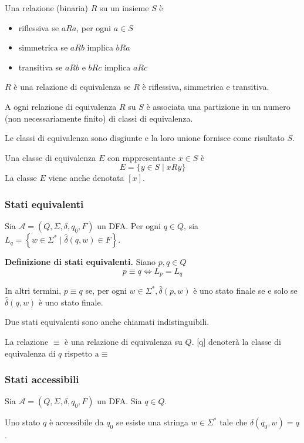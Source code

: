 Una relazione (binaria) $R$ su un insieme $S$ è
\begin{itemize}
    \item riflessiva se $a R a$, per ogni $a \in S$
    \item simmetrica se $a R b$ implica $b R a$
    \item transitiva se $a R b$ e $b R c$ implica $a R c$
\end{itemize}

$R$ è una relazione di equivalenza se $R$ è riflessiva, simmetrica e transitiva.

A ogni relazione di equivalenza $R$ su $S$ è associata una partizione in un numero (non necessariamente finito) di classi di equivalenza.

Le classi di equivalenza sono disgiunte e la loro unione fornisce come risultato $S$.

Una classe di equivalenza $E$ con rappresentante $x \in S$ è
$$
E=\{y \in S \mid x R y\}
$$
La classe $E$ viene anche denotata $[x]$.

\subsubsection{Stati equivalenti}

Sia $\mathcal{A}=\left(Q, \Sigma, \delta, q_{0}, F\right)$ un DFA.
Per ogni $q \in Q$, sia $L_{q}=\left\{w \in \Sigma^{*} \mid \hat{\delta}(q, w) \in F\right\} .$

\textbf{Definizione di stati equivalenti.} Siano $p, q \in Q$
$$
p \equiv q \Leftrightarrow L_{p}=L_{q}
$$

In altri termini, $p \equiv q$ se, per ogni $w \in \Sigma^{*}, \hat{\delta}(p, w)$ è uno stato finale se e solo se $\hat{\delta}(q, w)$ è uno stato finale.

Due stati equivalenti sono anche chiamati indistinguibili.

La relazione $\equiv$ è una relazione di equivalenza su $Q$.
[q] denoterà la classe di equivalenza di $q$ rispetto $\mathrm{a} \equiv$

\subsubsection{Stati accessibili}

Sia $\mathcal{A}=\left(Q, \Sigma, \delta, q_{0}, F\right)$ un DFA. Sia $q \in Q$.

Uno stato $q$ è accessibile da $q_{0}$ se esiste una stringa $w \in \Sigma^{*}$ tale che $\hat{\delta}\left(q_{0}, w\right)=q$.

